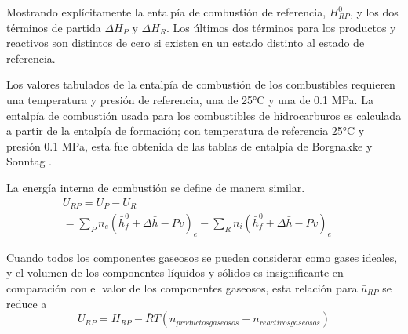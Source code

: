 \par Mostrando explícitamente la entalpía de combustión de referencia, $H^0_{RP}$, y los dos términos de partida $\Delta H_{P}$ y $\Delta H_{R}$. Los últimos dos términos para los productos y reactivos son distintos de cero si existen en un estado distinto al estado de referencia.
\par Los valores tabulados de la entalpía de combustión de los combustibles requieren una temperatura y presión de referencia, una  de 25°C y una  de 0.1 MPa. La entalpía de combustión usada para los combustibles de hidrocarburos es calculada a partir de la entalpía de formación; con temperatura de referencia 25°C y presión 0.1 MPa, esta fue obtenida de las tablas de entalpía de Borgnakke y Sonntag \cite{bib:vanwylen}.
\par La energía interna de combustión se define de manera similar.
\begin{equation}
\begin{gathered}
    U_{RP} = U_{P} - U_{R} \quad\quad\quad\quad\quad
    \quad\quad\quad\quad\quad\quad\quad\quad\quad\quad\quad\quad\quad\quad\\
    = \sum_P n_e (\bar h^0_{f} + \Delta \bar h - P\bar v)_{e} - \sum_R n_i (\bar h^0_{f} + \Delta \bar h - P\bar v)_{e}
\end{gathered}
\end{equation}
\par Cuando todos los componentes gaseosos se pueden considerar como gases ideales, y el volumen de los componentes líquidos y sólidos es insignificante en comparación con el valor de los componentes gaseosos, esta relación para $\bar u_{RP}$ se reduce a
\begin{equation}
        U_{RP} = H_{RP} - \bar RT (n_{productos gaseosos} - n_{reactivos gaseosos})
\end{equation}

